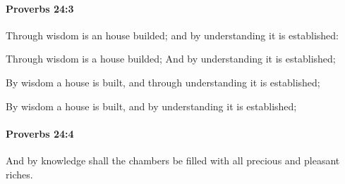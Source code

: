 		\paragraph{Proverbs 24:3} %
			\label{PROVERBS-24-3}

			Through wisdom is an house builded; and by understanding it is established:

			\begin{versebox}
					\item[BHS] 
					\item[ASV] Through wisdom is a house builded; And by understanding it is established;
					\item[NIV] By wisdom a house is built, and through understanding it is established;
					\item[NRSV] By wisdom a house is built, and by understanding it is established;
			\end{versebox}

		\paragraph{Proverbs 24:4} %
			\label{PROVERBS-24-4}

			And by knowledge shall the chambers be filled with all precious and pleasant riches.

